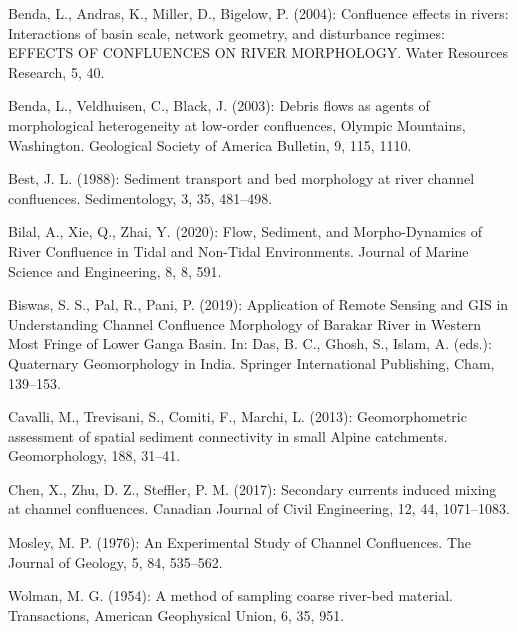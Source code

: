 {Benda, L., Andras, K., Miller, D., Bigelow, P. (2004): Confluence effects in rivers: Interactions of basin scale, network geometry, and disturbance regimes: EFFECTS OF CONFLUENCES ON RIVER MORPHOLOGY. Water Resources Research, 5, 40. 

Benda, L., Veldhuisen, C., Black, J. (2003): Debris flows as agents of morphological heterogeneity at low-order confluences, Olympic Mountains, Washington. Geological Society of America Bulletin, 9, 115, 1110. 

Best, J. L. (1988): Sediment transport and bed morphology at river channel confluences. Sedimentology, 3, 35, 481–498. 

Bilal, A., Xie, Q., Zhai, Y. (2020): Flow, Sediment, and Morpho-Dynamics of River Confluence in Tidal and Non-Tidal Environments. Journal of Marine Science and Engineering, 8, 8, 591. 

Biswas, S. S., Pal, R., Pani, P. (2019): Application of Remote Sensing and GIS in Understanding Channel Confluence Morphology of Barakar River in Western Most Fringe of Lower Ganga Basin. In: Das, B. C., Ghosh, S., Islam, A. (eds.): Quaternary Geomorphology in India. Springer International Publishing, Cham, 139–153. 

Cavalli, M., Trevisani, S., Comiti, F., Marchi, L. (2013): Geomorphometric assessment of spatial sediment connectivity in small Alpine catchments. Geomorphology, 188, 31–41. 

Chen, X., Zhu, D. Z., Steffler, P. M. (2017): Secondary currents induced mixing at channel confluences. Canadian Journal of Civil Engineering, 12, 44, 1071–1083. 

Mosley, M. P. (1976): An Experimental Study of Channel Confluences. The Journal of Geology, 5, 84, 535–562. 

Wolman, M. G. (1954): A method of sampling coarse river-bed material. Transactions, American Geophysical Union, 6, 35, 951.
}

